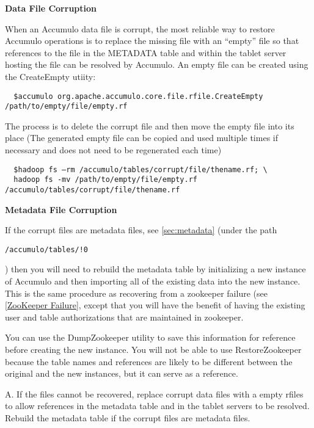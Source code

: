 {\bf Data File Corruption}

When an Accumulo data file is corrupt, the most reliable way to restore Accumulo
operations is to replace the missing file with an “empty” file so that
references to the file in the METADATA table and within the tablet server
hosting the file can be resolved by Accumulo. An empty file can be created using
the CreateEmpty utiity:

\begingroup\fontsize{8pt}{8pt}\selectfont\begin{verbatim}
  $accumulo org.apache.accumulo.core.file.rfile.CreateEmpty /path/to/empty/file/empty.rf
\end{verbatim}\endgroup

The process is to delete the corrupt file and then move the empty file into its
place (The generated empty file can be copied and used multiple times if necessary and does not need
to be regenerated each time)

\begingroup\fontsize{8pt}{8pt}\selectfont\begin{verbatim}
  $hadoop fs –rm /accumulo/tables/corrupt/file/thename.rf; \
  hadoop fs -mv /path/to/empty/file/empty.rf /accumulo/tables/corrupt/file/thename.rf
\end{verbatim}\endgroup

{\bf Metadata File Corruption}

If the corrupt files are metadata files, see \ref{sec:metadata} (under the path
\begin{verbatim}/accumulo/tables/!0\end{verbatim}) then you will need to rebuild
the metadata table by initializing a new instance of Accumulo and then importing
all of the existing data into the new instance.  This is the same procedure as
recovering from a zookeeper failure (see \ref{ZooKeeper Failure}, except that
you will have the benefit of having the existing user and table authorizations
that are maintained in zookeeper.

You can use the DumpZookeeper utility to save this information for reference
before creating the new instance.  You will not be able to use RestoreZookeeper
because the table names and references are likely to be different between the
original and the new instances, but it can serve as a reference.

A. If the files cannot be recovered, replace corrupt data files with a empty
rfiles to allow references in the metadata table and in the tablet servers to be
resolved. Rebuild the metadata table if the corrupt files are metadata files.

